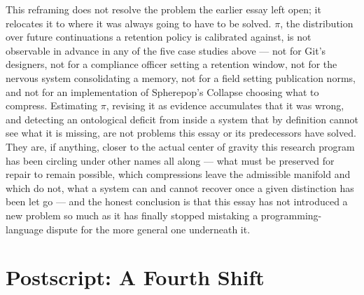 \documentclass[11pt]{article}
\begin{document}
This reframing does not resolve the problem the earlier essay left open; it relocates it to where it was always going to have to be solved. $\pi$, the distribution over future continuations a retention policy is calibrated against, is not observable in advance in any of the five case studies above --- not for Git's designers, not for a compliance officer setting a retention window, not for the nervous system consolidating a memory, not for a field setting publication norms, and not for an implementation of Spherepop's Collapse choosing what to compress. Estimating $\pi$, revising it as evidence accumulates that it was wrong, and detecting an ontological deficit from inside a system that by definition cannot see what it is missing, are not problems this essay or its predecessors have solved. They are, if anything, closer to the actual center of gravity this research program has been circling under other names all along --- what must be preserved for repair to remain possible, which compressions leave the admissible manifold and which do not, what a system can and cannot recover once a given distinction has been let go --- and the honest conclusion is that this essay has not introduced a new problem so much as it has finally stopped mistaking a programming-language dispute for the more general one underneath it.

\section{Postscript: A Fourth Shift}
\end{document}
